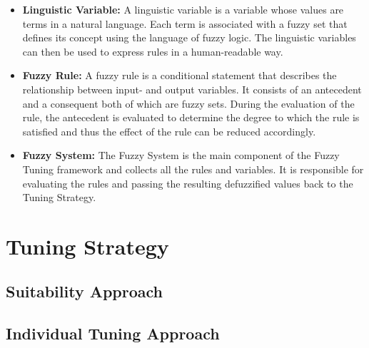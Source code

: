 \begin{itemize}

    \item \textbf{Linguistic Variable:} A linguistic variable is a variable whose values are terms in a natural language. Each term is associated with a fuzzy set that defines its concept using the language of fuzzy logic. The linguistic variables can then be used to express rules in a human-readable way.

    \item \textbf{Fuzzy Rule:} A fuzzy rule is a conditional statement that describes the relationship between input- and output variables. It consists of an antecedent and a consequent both of which are fuzzy sets. During the evaluation of the rule, the antecedent is evaluated to determine the degree to which the rule is satisfied and thus the effect of the rule can be reduced accordingly.

    \item \textbf{Fuzzy System:} The Fuzzy System is the main component of the Fuzzy Tuning framework and collects all the rules and variables. It is responsible for evaluating the rules and passing the resulting defuzzified values back to the Tuning Strategy.
\end{itemize}


\section{Tuning Strategy}

\subsection*{Suitability Approach}

\subsection*{Individual Tuning Approach}